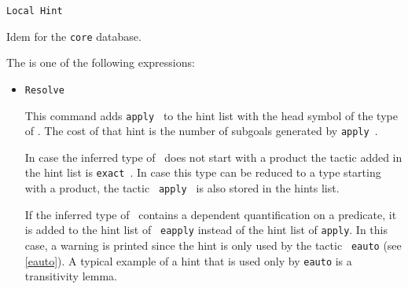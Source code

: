 \begin{coq_example*}
\begin{Variants}
\item {\tt Local Hint \hintdef}

  Idem for the {\tt core} database.

\end{Variants}

The {\hintdef} is one of the following expressions:

\begin{itemize}
\item {\tt Resolve \term}

  This command adds {\tt apply {\term}} to the hint list
  with the head symbol of the type of \term. The cost of that hint is
  the number of subgoals generated by {\tt apply {\term}}.

  In case the inferred type of \term\ does not start with a product the
  tactic added in the hint list is {\tt exact {\term}}. In case this
  type can be reduced to a type starting with a product, the tactic {\tt
    apply {\term}} is also stored in the hints list.

  If the inferred type of \term\ contains a dependent
  quantification on a predicate, it is added to the hint list of {\tt
    eapply} instead of the hint list of {\tt apply}. In this case, a
  warning is printed since the hint is only used by the tactic {\tt
    eauto} (see \ref{eauto}). A typical example of a hint that is used
  only by \texttt{eauto} is a transitivity lemma.


\end{itemize}
\end{coq_example*}
